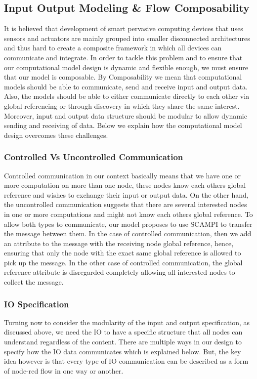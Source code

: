 \subsection{Input Output Modeling \& Flow Composability}
It is believed that development of smart pervasive computing devices that uses sensors and actuators are mainly grouped into smaller disconnected architectures and thus hard to create a composite framework in which all devices can communicate and integrate\cite{5470524}. In order to tackle this problem and to ensure that our computational model design is dynamic and flexible enough, we must ensure that our model is composable. By Composability we mean that computational models should be able to communicate, send and receive input and output data. Also, the models should be able to either communicate directly to each other via global referencing or through discovery in which they share the same interest. Moreover, input and output data structure should be modular to allow dynamic sending and receiving of data. Below we explain how the computational model design overcomes these challenges. 

\subsubsection{Controlled Vs Uncontrolled Communication}
Controlled communication in our context basically means that we have one or more computation on more than one node, these nodes know each others global reference and wishes to exchange their input or output data. On the other hand, the uncontrolled communication suggests that there are several interested nodes in one or more computations and might not know each others global reference.
To allow both types to communicate, our model proposes to use SCAMPI to transfer the message between them. In the case of controlled communication, then we add an attribute to the message with the receiving node global reference, hence, ensuring that only the node with the exact same global reference is allowed to pick up the message. In the other case of controlled communication, the global reference attribute is disregarded completely allowing all interested nodes to collect the message.

\newpage
\subsubsection{IO Specification}
Turning now to consider the modularity of the input and output specification, as discussed above, we need the IO to have a specific structure that all nodes can understand regardless of the content. There are multiple ways in our design to specify how the IO data communicates which is explained below. But, the key idea however is that every type of IO communication can be described as a form of node-red flow in one way or another.

